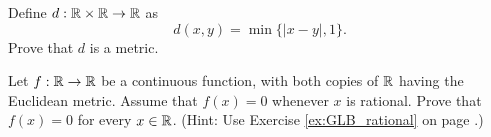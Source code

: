 



\item \label{ex:min_1_metric} Define $d: \mathbb{R} \times \mathbb{R} \to \mathbb{R}$ as 
\[d(x,y) = \min\{|x-y|,1\}.\]
Prove that $d$ is a metric.

\begin{comment}

\ExerciseSolution Let $x, y, z \in \R$. By definition, $d(x,y) \geq 0$. Since $|x - x| = 0$, we see that $d(x,x) = 0$. Also, if $d(x,y) = 0$, then $0 = d(x,y) = |x-y|$ and $x=y$. 

If $d(x,y) = 1$, then $|x-y| = |y-x| \geq 1$ and so $d(y,x) = d(x,y) = 1$. If $d(x,y) < 1$, then $|x-y| = |y-x| < 1$ and so $d(y,x) = |y-x| = d(x,y)$. 

Finally, we verify the triangle inequality using cases.
\begin{itemize}
	\item Suppose one of $d(x,y)$ is $1$. Without loss of generality, assume $d(x,y) = 1$. Now $d(x,z) \leq 1$, so 
\[d(x,z) \leq 1 \leq 1 + d(y,z) = d(x,y) + d(y,z).\]

\item Suppose that $d(x,y) = |x-y| < 1$ and $d(y,z) = |y-z| < 1$. Since $d(x,z) \leq |x-z|$ we have 
\[d(x,z) \leq |x-z| \leq |x-y|+|y-z| = d(x,y) + d(y,z).\]	
	
	\end{itemize}
	
\end{itemize}

We conclude that $d$ is a metric on $\R$. 

\end{comment}


\item Let $f : \mathbb{R} \to \mathbb{R}$ be a continuous function, with both copies of $\mathbb{R}$ having the Euclidean metric. Assume that $f(x) = 0$ whenever $x$ is rational. Prove that $f(x) = 0$ for every $x \in \mathbb{R}$. (Hint: Use Exercise \ref{ex:GLB_rational} on page \pageref{ex:GLB_rational}.)

\begin{comment}

\ExerciseSolution Suppose to the contrary that $f(y) \neq 0$ for some irrational number $y$. Let $\epsilon$ be a positive real number less than $|f(y)|$. Let $\delta$ be a positive real number. By Exercise \ref{ex:GLB_rational} on page \pageref{ex:GLB_rational} we can always find a rational number between any two real numbers. So there is a rational number $r$ in the interval $(y - \delta, y + \delta)$. So even though $|r - y| < \delta$, we have $|f(r)-f(y)| = |f(y)| > \epsilon$. This implies that $f$ is not continuous at $y$, a contradiction. We conclude that $f(y) = 0$ for every irrational number $y$ and $f(x) = 0$ for every $x \in \R$. 

\end{comment}


